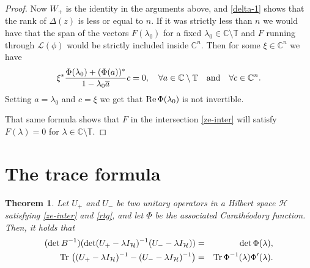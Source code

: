 \documentclass[12pt]{amsart}
\newtheorem{thm}{Theorem}[section]
\theoremstyle{definition}
\theoremstyle{remark}
\numberwithin{equation}{section}
\begin{document}
\begin{proof}
  Now $W_+$ is the identity in the arguments above, and  \eqref{delta-1} shows that the rank of $\Delta(z)$ is less or equal to $n$. If it was strictly less than $n$
  we would have that the span of the vectors $F(\lambda_0)$ for a fixed $\lambda_0\in\mathbb C\setminus\mathbb T$ and $F$ running through $\mathcal L(\phi)$
  would be strictly included inside $\mathbb C^n$.
  Then for some $\xi\in\mathbb C^n$ we have
  \[
\xi^*\frac{\Phi(\lambda_0)+(\Phi(a))^*}{1-\lambda_0\overline{a}}c=0,\quad \forall a\in \mathbb C\setminus\mathbb T\quad{\rm and}\quad \forall c\in\mathbb C^n.
\]
Setting $a=\lambda_0$ and $c=\xi$ we get that ${\rm Re}\, \Phi(\lambda_0)$ is not invertible.\smallskip

  That same formula shows that $F$ in the intersection \eqref{ze-inter} will satisfy $F(\lambda)=0$ for $\lambda\in\mathbb C\setminus\mathbb T$.
  \end{proof}



\section{The trace formula}
\setcounter{equation}{0}
\label{Tr1}
\begin{thm}
  Let $U_+$ and  $U_-$ be two unitary operators in a Hilbert space $\mathcal H$ satisfying \eqref{ze-inter} and \eqref{rtg}, and let $\Phi$ be the associated Carath\'eodory
  function. Then, it holds that
  \begin{eqnarray}
    \label{tre-delta}
  (\det B^{-1})(\det(U_+-{{\lambda}} I_{\mathcal H})^{-1}(U_--{{\lambda}} I_{\mathcal H}))&=&   \det\Phi({\lambda}),\\
    {\rm Tr}\,\left((U_+-{\lambda}I_{\mathcal H})^{-1}-(U_--{\lambda}I_{\mathcal H})^{-1}\right)&=&{\rm Tr}\, \Phi^{-1}({\lambda})\Phi^\prime({\lambda}).
                                                                                       \label{tre-delta-2}
    \end{eqnarray}
  \end{thm}
\end{document}

